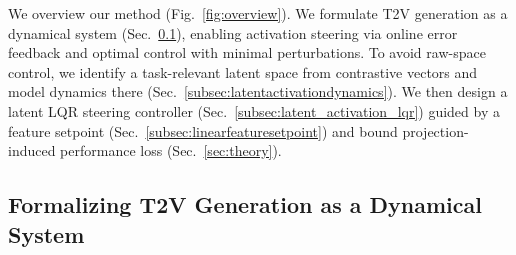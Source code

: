 \documentclass{article}
\begin{document}
 We overview our method (Fig.~\ref{fig:overview}). We formulate T2V generation as a dynamical system (Sec.~\ref{sec:methods_dynamics}), enabling activation steering via online error feedback and optimal control with minimal perturbations. To avoid raw-space control, we identify a task-relevant latent space from contrastive vectors and model dynamics there (Sec.~\ref{subsec:latentactivationdynamics}). We then design a latent LQR steering controller (Sec.~\ref{subsec:latent_activation_lqr}) guided by a feature setpoint (Sec.~\ref{subsec:linearfeaturesetpoint}) and bound projection-induced performance loss (Sec.~\ref{sec:theory}).

\subsection{Formalizing T2V Generation as a Dynamical System}\label{sec:methods_dynamics}
\vspace{-5pt}
\end{document}

